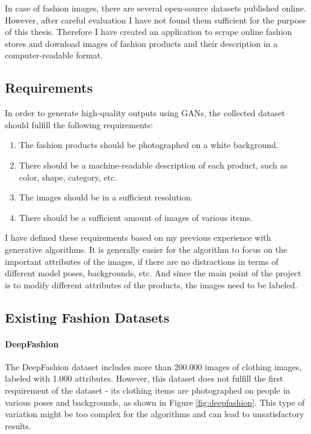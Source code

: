 \documentclass[12pt]{report}
\begin{document}
In case of fashion images, there are several open-source datasets published online. However, after careful evaluation I have not found them sufficient for the purpose of this thesis. Therefore I have created an application to scrape online fashion stores and download images of fashion products and their description in a computer-readable format.

\pagebreak
\subsection{Requirements}

In order to generate high-quality outputs using GANs, the collected dataset should fulfill the following requirements:
\begin{enumerate}
\item The fashion products should be photographed on a white background. 
\item There should be a machine-readable description of each product, such as color, shape, category, etc. 
\item The images should be in a sufficient resolution.
\item There should be a sufficient amount of images of various items.

\end{enumerate}
I have defined these requirements based on my previous experience with generative algorithms. It is generally easier for the algorithm to focus on the important attributes of the images, if there are no distractions in terms of different model poses, backgrounds, etc. And since the main point of the project is to modify different attributes of the products, the images need to be labeled.

\pagebreak
\subsection{Existing Fashion Datasets}
\paragraph{DeepFashion}
The DeepFashion dataset \cite{liu2016deepfashion} includes more than 200.000 images of clothing images, labeled with 1.000 attributes. However, this dataset does not fulfill the first requirement of the dataset - its clothing items are photographed on people in various poses and backgrounds, as shown in Figure \ref{fig:deepfashion}. This type of variation might be too complex for the algorithms and can lead to unsatisfactory results.
\end{document}
